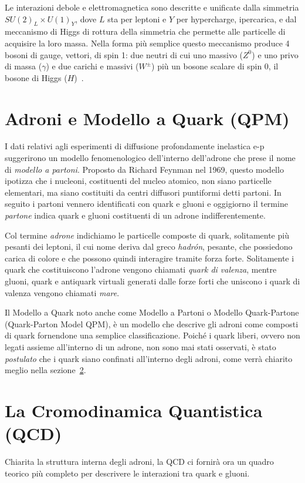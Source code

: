     Le interazioni debole e elettromagnetica sono descritte e unificate dalla simmetria $SU(2)_L \times U(1)_Y$, dove $L$ sta per leptoni e $Y$ per hypercharge, ipercarica, e dal meccanismo di Higgs di rottura della simmetria che permette alle particelle di acquisire la loro massa. Nella forma più semplice questo meccanismo produce 4 bosoni di gauge, vettori, di spin 1: due neutri di cui uno massivo ($Z^0$) e uno privo di massa ($\gamma$) e due carichi e massivi ($W^\pm$) più un bosone scalare di spin 0, il bosone di Higgs ($H$)~\cite{Vitale_1995}.

    \newpage

\section{Adroni e Modello a Quark (QPM)}
\label{sec:QPM}
    I dati relativi agli esperimenti di diffusione profondamente inelastica e-p suggerirono un modello fenomenologico dell'interno dell'adrone che prese il nome di \textit{modello a partoni}. Proposto da Richard Feynman nel 1969, questo modello ipotizza che i nucleoni, costituenti del nucleo atomico, non siano particelle elementari, ma siano costituiti da centri diffusori puntiformi detti partoni. In seguito i partoni vennero identificati con quark e gluoni e oggigiorno il termine \textit{partone} indica quark e gluoni costituenti di un adrone indifferentemente.
    
    Col termine \textit{adrone} indichiamo le particelle composte di quark, solitamente più pesanti dei leptoni, il cui nome deriva dal greco \textit{hadrón}, pesante, che possiedono carica di colore e che possono quindi interagire tramite forza forte. Solitamente i quark che costituiscono l'adrone vengono chiamati \textit{quark di valenza}, mentre gluoni, quark e antiquark virtuali generati dalle forze forti che uniscono i quark di valenza vengono chiamati \textit{mare}.

    Il Modello a Quark noto anche come Modello a Partoni o Modello Quark-Partone (Quark-Parton Model QPM), è un modello che descrive gli adroni come composti di quark fornendone una semplice classificazione. Poiché i quark liberi, ovvero non legati assieme all'interno di un adrone, non sono mai stati osservati, è stato \textit{postulato} che i quark siano confinati all'interno degli adroni, come verrà chiarito meglio nella sezione~\ref{sec:QCD}.

\section{La Cromodinamica Quantistica (QCD)}
\label{sec:QCD}
    Chiarita la struttura interna degli adroni, la QCD ci fornirà ora un quadro teorico più completo per descrivere le interazioni tra quark e gluoni.

